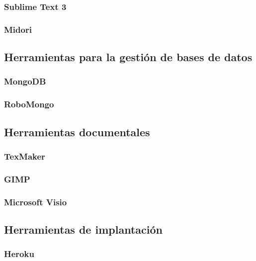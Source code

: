		\subsubsection{Sublime Text 3}
		
		\subsubsection{Midori}
	
	\subsection{Herramientas para la gestión de bases de datos}
		\subsubsection{MongoDB}
		
		\subsubsection{RoboMongo}
	
	\subsection{Herramientas documentales}
		\subsubsection{TexMaker}
		
		\subsubsection{GIMP}
		
		\subsubsection{Microsoft Visio}
	
	\subsection{Herramientas de implantación}
		\subsubsection{Heroku}


